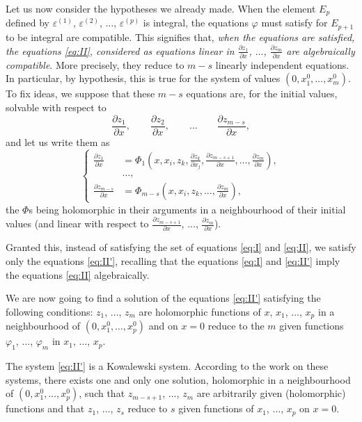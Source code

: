 \documentclass[leqno,11pt]{book}
\makeatletter
\newcommand{\pd}{\partial}
\theoremstyle{shape1}
\theoremstyle{shapesmall}
\let\old@phi\phi
\let\old@varphi\varphi
\let\old@epsilon\epsilon
\let\old@varepsilon\varepsilon
\let\phi\old@varphi
\let\varphi\old@phi
\let\epsilon\old@varepsilon
\let\varepsilon\old@epsilon
\makeatother
\begin{document}
Let us now consider the hypotheses we already made. When the element $E_{p}$ defined by $\epsilon^{(1)}$, $\epsilon^{(2)}$, $\dots$, $\epsilon^{(p)}$ is integral, the equations $\phi$ must satisfy for $E_{p+1}$ to be integral are compatible. This signifies that, \emph{when the equations are satisfied, the equations \eqref{eq:II}, considered as equations linear in $\frac{\pd z_{1}}{\pd x}$, $\dots$, $\frac{\pd z_{m}}{\pd x}$ are algebraically compatible}. More precisely, they reduce to $m-s$ linearly independent equations. In particular, by hypothesis, this is true for the system of values $(0,x_{1}^{0}, \dots, x_{m}^{0})$. To fix ideas, we suppose that these $m-s$ equations are, for the initial values, solvable with respect to
\[
\frac{\pd z_{1}}{\pd x},\qquad\frac{\pd z_{2}}{\pd x},\qquad\dots\qquad\frac{\pd z_{m-s}}{\pd x},
\]
and let us write them as
\begin{equation}
  \label{eq:II'}\tag{II$'$}
  \left\{
    \begin{aligned}
      \frac{\pd z_{1}}{\pd x}&=\Phi_{1}\left(x,x_{i},z_{k},\frac{\pd z_{k}}{\pd x_{j}},\frac{\pd z_{m-s+1}}{\pd x},\dots,\frac{\pd z_{m}}{\pd x}\right),\\
      &\dots,\\
      \frac{\pd z_{m-s}}{\pd x}&=\Phi_{m-s}\left(x,x_{i},z_{k},\dots,\frac{\pd z_{m}}{\pd x}\right),
    \end{aligned}
  \right.
\end{equation}
the $\Phi$s being holomorphic in their arguments in a neighbourhood of their initial values (and linear with respect to $\frac{\pd z_{m-s+1}}{\pd x}$, $\dots$, $\frac{\pd z_{m}}{\pd x}$).

Granted this, instead of satisfying the set of equations \eqref{eq:I} and \eqref{eq:II}, we satisfy only the equations \eqref{eq:II'}, recalling that the equations \eqref{eq:I} and \eqref{eq:II'} imply the equations \eqref{eq:II} algebraically.

We are now going to find a solution of the equations \eqref{eq:II'} satisfying the following conditions: $z_{1}$, $\dots$, $z_{m}$ are holomorphic functions of $x$, $x_{1}$, $\dots$, $x_{p}$ in a neighbourhood of $(0,x_{1}^{0}, \dots, x_{p}^{0})$ and on $x=0$ reduce to the $m$ given functions $\phi_{1}$, $\dots$, $\phi_{m}$ in $x_{1}$, $\dots$, $x_{p}$.

The system \eqref{eq:II'} is a Kowalewski system. According to the work on these systems, there exists one and only one solution, holomorphic in a neighbourhood of $(0,x_{1}^{0},\dots,x_{p}^{0})$, such that $z_{m-s+1}$, $\dots$, $z_{m}$ are arbitrarily given (holomorphic) functions and that $z_{1}$, $\dots$, $z_{s}$ reduce to $s$ given functions of $x_{1}$, $\dots$, $x_{p}$ on $x=0$. 
\end{document}
